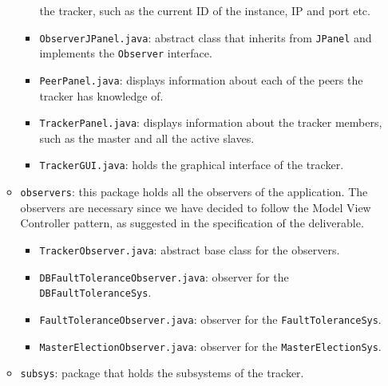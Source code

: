\documentclass[twoside,a4paper,10pt]{article}
\begin{document}
\begin{itemize}
\begin{itemize}
\begin{itemize}
      the tracker, such as the current ID of the instance, IP and port etc.
    \item \texttt{ObserverJPanel.java}: abstract class that inherits from
      \texttt{JPanel} and implements the \texttt{Observer} interface.
    \item \texttt{PeerPanel.java}: displays information about each of the
      peers the tracker has knowledge of.
    \item \texttt{TrackerPanel.java}: displays information about the tracker
      members, such as the master and all the active slaves.
    \item \texttt{TrackerGUI.java}: holds the graphical interface of the
      tracker.
    \end{itemize}
  \item \texttt{observers}: this package holds all the observers of the
    application.
    The observers are necessary since we have decided to follow the Model View
    Controller pattern, as suggested in the specification of the deliverable.
    
    \begin{itemize}
    \item \texttt{TrackerObserver.java}: abstract base class for the observers.
    \item \texttt{DBFaultToleranceObserver.java}: observer for the
      \texttt{DBFaultToleranceSys}.
    \item \texttt{FaultToleranceObserver.java}: observer for the
      \texttt{FaultToleranceSys}.
    \item \texttt{MasterElectionObserver.java}: observer for the
      \texttt{MasterElectionSys}.
    \end{itemize}
  \item \texttt{subsys}: package that holds the subsystems of the tracker.
    

\end{itemize}
\end{itemize}
\end{document}
